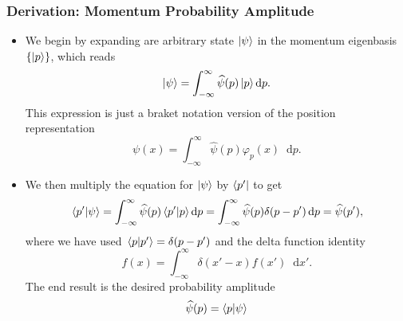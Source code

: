 \documentclass[11pt, a4paper]{article}
\newcommand{\diff}{\mathop{}\!\mathrm{d}} %
\newcommand{\F}[1]{\widehat{#1}} %
\begin{document}
\subsubsection{Derivation: Momentum Probability Amplitude}
\begin{itemize}

    \item We begin by expanding are arbitrary state $ \ket{\psi} $ in the momentum eigenbasis $ \{\ket{p}\} $, which reads
    \begin{equation*}
        \ket{\psi} = \int_{-\infty}^{\infty} \F{\psi}(p) \ket{p} \diff p.
    \end{equation*}
    This expression is just a braket notation version of the position representation
    \begin{equation*}
        \psi(x) = \int_{-\infty}^{\infty}\F{\psi}(p)\varphi_{p}(x)\diff p.
    \end{equation*}
    
    \item We then multiply the equation for $ \ket{\psi} $ by $ \bra{p'} $ to get
    \begin{equation*}
        \braket*{p'}{\psi} = \int_{-\infty}^{\infty} \F{\psi}(p) \braket*{p'}{p}\diff p = \int_{-\infty}^{\infty} \F{\psi}(p) \delta(p - p') \diff p = \F{\psi}(p'),
    \end{equation*}
    where we have used $ \braket*{p}{p'} = \delta(p - p') $ and the delta function identity 
    \begin{equation*}
        f(x) = \int_{-\infty}^{\infty}\delta(x' - x)f(x')\diff x'.
    \end{equation*}
    The end result is the desired probability amplitude
    \begin{equation*}
        \F{\psi}(p) = \braket{p}{\psi}
    \end{equation*}
    
\end{itemize}
\end{document}

